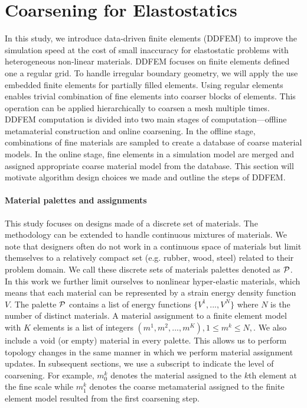 \section{Coarsening for Elastostatics}
In this study, we introduce data-driven finite elements (DDFEM) to 
improve the simulation speed at the cost of small inaccuracy for elastostatic problems with heterogeneous non-linear materials. DDFEM focuses on finite elements defined one a regular grid.
To handle irregular boundary geometry, we will apply the use embedded finite elements for partially filled elements.
Using regular elements enables trivial combination of fine elements into coarser blocks of elements. This operation can be applied hierarchically to coarsen a mesh multiple times.
DDFEM computation is divided into two main stages of computation---offline metamaterial construction and online coarsening.
In the offline stage, combinations of fine materials are sampled to create a database of
coarse material models. In the online stage, fine elements in a simulation model are merged and assigned appropriate coarse material model from the database.
This section will motivate algorithm design choices we made and outline the steps of DDFEM.

\paragraph{Material palettes and assignments}
This study focuses on designs made of a discrete set of materials. The methodology can be extended to handle continuous mixtures of materials.
We note that designers often do not work in a continuous space of materials but limit themselves to a relatively compact set (e.g. rubber, wood, steel) related to their problem domain. We call these discrete sets of materials palettes denoted as $\mathcal{P}$. In this work we further limit ourselves to nonlinear hyper-elastic materials, which means that each material can be represented by a strain energy density function $V$. The palette $\mathcal{P}$ contains a list of energy functions $\{V^1,...,V^N\}$ where $N$ is the number of distinct materials.
A material assignment to a finite element model with $K$ elements is a list of integers $(m^1,m^2,...,m^K), 1\leq m^k\leq N,$.
We also include a void (or empty) material in every palette. This allows us to perform topology changes in the same manner in which we perform material assignment updates.
In subsequent sections, we use a subscript to indicate the level of coarsening. For example, $m_0^k$ denotes the material assigned to the $k$th element at the fine scale while $m_1^k$ denotes the coarse metamaterial assigned to the finite element model resulted from the first coarsening step.

